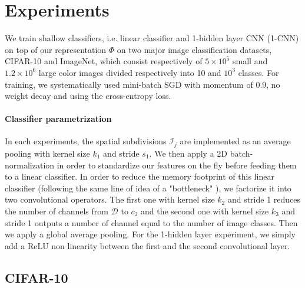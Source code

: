 \documentclass{article} %
\newcommand{\Edouard}[1]{\textcolor{blue}{#1}}
\begin{document}
\section{Experiments}
\label{experiments}
We train  shallow classifiers, i.e. linear classifier and 1-hidden layer CNN (1-CNN) on top of our representation $\Phi$ on two major  image classification datasets,  CIFAR-10 and ImageNet, which consist respectively of $5\times10^5$ small and $1.2\times10^6$ large color images  divided respectively into 10 and $10^3$ classes.
For training, we systematically used mini-batch SGD with momentum of 0.9, no weight decay and using the cross-entropy loss.


\paragraph{Classifier parametrization} In each experiments, the spatial subdivisions $\mathcal{I}_j$ are implemented as an average pooling with kernel size $k_1$ and stride $s_1$.
We then apply a 2D batch-normalization \citep{ioffe2015batch} in order to standardize our features on the fly before feeding them to a linear classifier.
In order to reduce the memory footprint of this linear classifier (following the same line of idea of a "bottleneck" \citep{he2016deep}), we factorize it into two convolutional operators.
The first one with kernel size $k_2$ and stride 1 reduces the number of channels from $\mathcal{D}$ to $c_2$ and the second one with kernel size $k_3$ and stride 1 outputs a number of channel equal to the number of image classes.
Then we apply a global average pooling.
For the 1-hidden layer experiment, we simply add a ReLU non linearity between the first and the second convolutional layer.




\subsection{CIFAR-10}
\end{document}
